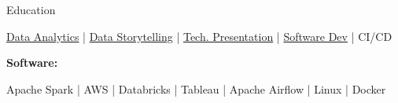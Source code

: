 \documentclass{resume/resume}
\begin{document}
\begin{rSection}{Education}
\begin{adjustwidth}{6em}{0pt}
  \href{https://github.com/UtahTriangle/Laws/blob/main/Proposals/NationalsHelp/geography_hypos.ipynb}{Data Analytics} |  %
  \href{https://spelkington.github.io/assets/utah_office_update.pdf#page=17}{Data Storytelling} |  %
  \href{https://www.youtube.com/watch?v=lMFQp3wN-cg}{Tech. Presentation} |
  \href{https://github.com/spelkington}{Software Dev} |
  CI/CD
  
\end{adjustwidth}


%
%
%
\vspace{-3pt}
{\bf Software:}
\vspace{-1.83em}
\begin{adjustwidth}{6em}{0pt}
  Apache Spark | 
  AWS | 
  Databricks | 
  Tableau | 
  Apache Airflow |
  Linux |
  Docker


\end{adjustwidth}
\end{rSection}
\end{document}
